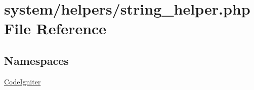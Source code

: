 \hypertarget{string__helper_8php}{}\section{system/helpers/string\+\_\+helper.php File Reference}
\label{string__helper_8php}
\subsection*{Namespaces}
\begin{DoxyCompactItemize}
\item 
 \mbox{\hyperlink{namespace_code_igniter}{Code\+Igniter}}
\end{DoxyCompactItemize}
